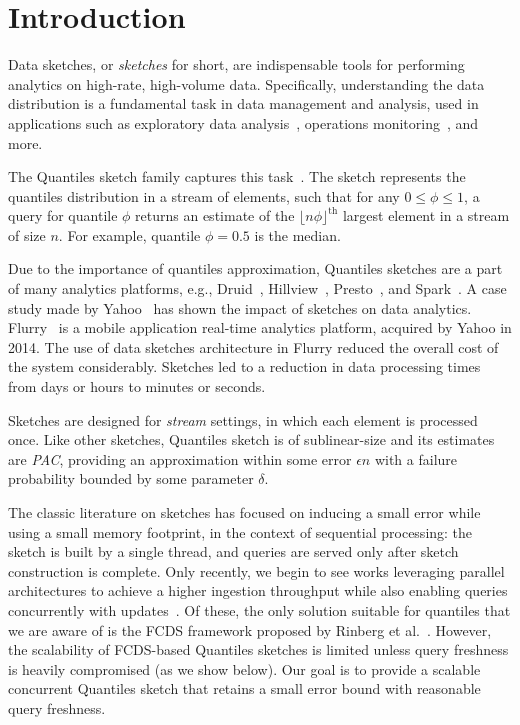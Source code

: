 \chapter{Introduction}
\label{chap:intro}

Data sketches, or \emph{sketches} for short, are indispensable tools for performing analytics on high-rate, high-volume data. Specifically, understanding the data distribution is a fundamental task in data management and analysis, used in applications such as exploratory data analysis~\cite{vartak2015seedb}, operations monitoring~\cite{abraham2013scuba}, and more. 

The Quantiles sketch family captures this task~\cite{masson2019ddsketch, mergeables_summaries, gan2018moment, cormode2021relative}. The sketch represents the quantiles distribution in a stream of elements, such that for any $0 \leq \phi \leq 1$, a query for quantile $\phi$ returns an estimate of the $\lfloor n\phi \rfloor ^{\text{th}}$ largest element in a stream of size $n$. For example, quantile $\phi=0.5$ is the median. 

Due to the importance of quantiles approximation, Quantiles sketches are a part of many analytics platforms, e.g., Druid~\cite{druid-quantiles}, Hillview~\cite{budiu2019hillview}, Presto~\cite{presto}, and Spark~\cite{spark}. A case study made by Yahoo~\cite{flurry_study} has shown the impact of sketches on data analytics. Flurry~\cite{flurry} is a mobile application real-time analytics platform, acquired by Yahoo in 2014. The use of data sketches architecture in Flurry reduced the overall cost of the system considerably. Sketches led to a reduction in data processing times from days or hours to minutes or seconds.

Sketches are designed for \emph{stream} settings, in which each element is processed once. Like other sketches, Quantiles sketch is of sublinear-size and its estimates are \emph{\gls{PAC}}, providing an approximation within some error $\epsilon n$ with a failure probability bounded by some parameter $\delta$. 

The classic literature on sketches has focused on inducing a small error while using a small memory footprint, in the context of sequential processing: the sketch is built by a single thread, and queries are served only after sketch construction is complete. Only recently, we begin to see works leveraging parallel architectures to achieve a higher ingestion throughput while also enabling queries concurrently with updates~\cite{Rinberg_2020_fast_sketches, stylianopoulos2020delegation}. 
Of these, the only solution suitable for quantiles that we are aware of is the \acrfull{FCDS} framework proposed by Rinberg et al.~\cite{Rinberg_2020_fast_sketches}. However, the scalability of FCDS-based Quantiles sketches is limited unless query freshness is heavily compromised (as we show below). Our goal is to provide a scalable concurrent Quantiles sketch that retains a small error bound with reasonable query freshness.

